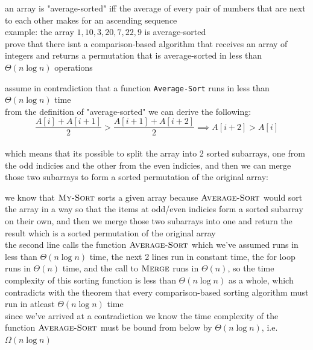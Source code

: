 \documentclass[a4paper,12pt]{article}
\begin{document}
\begin{question}
an array is "average-sorted" iff the average of every pair of numbers that are next to each other makes for an ascending sequence\\[0pt]
example: the array \(1,10,3,20,7,22,9\) is average-sorted\\[0pt]
prove that there isnt a comparison-based algorithm that receives an array of integers and returns a permutation that is average-sorted in less than \(\Theta(n\log n)\) operations\\[0pt]
\begin{answer}
assume in contradiction that a function \texttt{Average-Sort} runs in less than \(\Theta(n\log n)\) time\\[0pt]
from the definition of "average-sorted" we can derive the following:\\[0pt]
\[
\frac{A[i]+A[i+1]}{2} > \frac{A[i+1]+A[i+2]}{2} \implies A[i+2] > A[i]
\]\\[0pt]
which means that its possible to split the array into 2 sorted subarrays, one from the odd indicies and the other from the even indicies, and then we can merge those two subarrays to form a sorted permutation of the original array:\\[0pt]
\begin{center}

\end{center}

we know that \(\textsc{My-Sort}\) sorts a given array because \(\textsc{Average-Sort}\) would sort the array in a way so that the items at odd/even indicies form a sorted subarray on their own, and then we merge those two subarrays into one and return the result which is a sorted permutation of the original array\\[0pt]
the second line calls the function \(\textsc{Average-Sort}\) which we've assumed runs in less than \(\Theta(n\log n)\) time, the next 2 lines run in constant time, the for loop runs in \(\Theta(n)\) time, and the call to \(\textsc{Merge}\) runs in \(\Theta(n)\), so the time complexity of this sorting function is less than \(\Theta(n\log n)\) as a whole, which contradicts with the theorem that every comparison-based sorting algorithm must run in atleast \(\Theta(n\log n)\) time\\[0pt]
since we've arrived at a contradiction we know the time complexity of the function \(\textsc{Average-Sort}\) must be bound from below by \(\Theta(n\log n)\), i.e. \(\Omega(n\log n)\)\\[0pt]
\end{answer}
\end{question}
\end{document}
